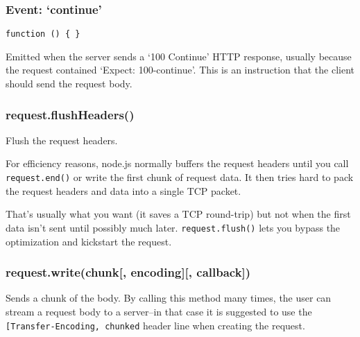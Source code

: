\begin{Shaded}
\begin{Highlighting}[]
   
  \NormalTok{();}

  \NormalTok{(}\NormalTok{, }
    \NormalTok{(}\NormalTok{);}
    \NormalTok{();}
    \NormalTok{(}\NormalTok{);}
  \NormalTok{\});}
\NormalTok{\});}
\end{Highlighting}
\end{Shaded}

\subsubsection{\texorpdfstring{Event:
`continue'}{Event: continue}}\label{event-continue}

\texttt{function\ ()\ \{\ \}}

Emitted when the server sends a `100 Continue' HTTP response, usually
because the request contained `Expect: 100-continue'. This is an
instruction that the client should send the request body.

\subsubsection{request.flushHeaders()}\label{request.flushheaders}

Flush the request headers.

For efficiency reasons, node.js normally buffers the request headers
until you call \texttt{request.end()} or write the first chunk of
request data. It then tries hard to pack the request headers and data
into a single TCP packet.

That's usually what you want (it saves a TCP round-trip) but not when
the first data isn't sent until possibly much later.
\texttt{request.flush()} lets you bypass the optimization and kickstart
the request.

\subsubsection{request.write(chunk{[}, encoding{]}{[},
callback{]})}\label{request.writechunk-encoding-callback}

Sends a chunk of the body. By calling this method many times, the user
can stream a request body to a server--in that case it is suggested to
use the
\texttt{{[}\textquotesingle{}Transfer-Encoding\textquotesingle{},\ \textquotesingle{}chunked\textquotesingle{}{]}}
header line when creating the request.

